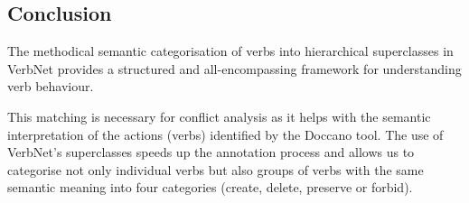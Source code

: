 \subsection*{Conclusion}\label{nlp_bottom_line}
The methodical semantic categorisation of verbs into hierarchical superclasses in VerbNet provides a structured and all-encompassing framework for understanding verb behaviour. 

This matching is necessary for conflict analysis as it helps with the semantic interpretation of the actions (verbs) identified by the Doccano tool. The use of VerbNet's superclasses speeds up the annotation process and allows us to categorise not only individual verbs but also groups of verbs with the same semantic meaning into four categories (create, delete, preserve or forbid).
